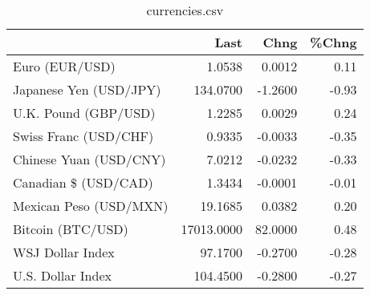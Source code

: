 \documentclass{article}%
\begin{document}
%


\begin{table}[htbp]%
\caption{currencies.csv}%
\centering%
\begin{adjustbox}{width=1\textwidth}%
\begin{tabular}{lrrr}
\toprule
                       &       Last &    Chng &  \%Chng \\
\midrule
        Euro (EUR/USD) &     1.0538 &  0.0012 &   0.11 \\
Japanese Yen (USD/JPY) &   134.0700 & -1.2600 &  -0.93 \\
  U.K. Pound (GBP/USD) &     1.2285 &  0.0029 &   0.24 \\
 Swiss Franc (USD/CHF) &     0.9335 & -0.0033 &  -0.35 \\
Chinese Yuan (USD/CNY) &     7.0212 & -0.0232 &  -0.33 \\
  Canadian \$ (USD/CAD) &     1.3434 & -0.0001 &  -0.01 \\
Mexican Peso (USD/MXN) &    19.1685 &  0.0382 &   0.20 \\
     Bitcoin (BTC/USD) & 17013.0000 & 82.0000 &   0.48 \\
      WSJ Dollar Index &    97.1700 & -0.2700 &  -0.28 \\
     U.S. Dollar Index &   104.4500 & -0.2800 &  -0.27 \\
\bottomrule
\end{tabular}
%
\end{adjustbox}%
\end{table}

%
\end{document}
